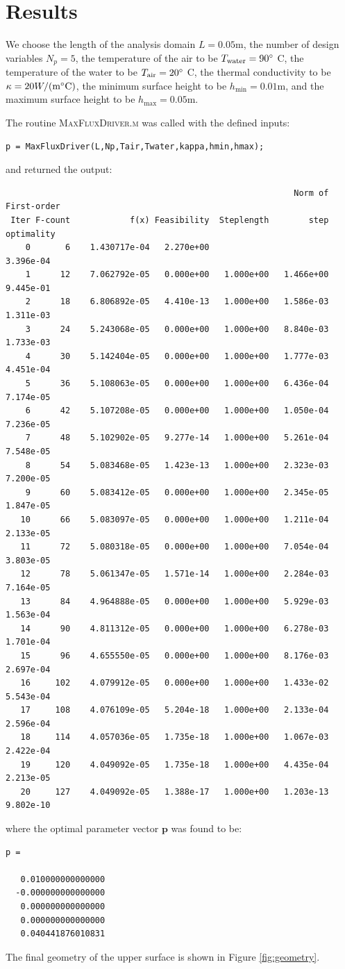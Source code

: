\documentclass[11pt]{article}
\begin{document}
\section{Results}

We choose the length of the analysis domain $L=0.05$m, the
number of design variables $N_p = 5$, the temperature of the
air to be $T_\text{water} = 90 \degree$ C, the temperature of the
water to be $T_\text{air} = 20 \degree$ C, the thermal
conductivity to be $\kappa = 20 W / (\text{m} \degree \text{C})$,
the minimum surface height to be $h_{\text{min}} = 0.01$m, and
the maximum surface height to be $h_{\text{max}} = 0.05$m.

The routine \textsc{MaxFluxDriver.m} was called with the defined
inputs:
\begin{verbatim}
p = MaxFluxDriver(L,Np,Tair,Twater,kappa,hmin,hmax);
\end{verbatim}
and returned the output:
\begin{verbatim}
                                                          Norm of First-order
 Iter F-count            f(x) Feasibility  Steplength        step  optimality
    0       6    1.430717e-04   2.270e+00                           3.396e-04
    1      12    7.062792e-05   0.000e+00   1.000e+00   1.466e+00   9.445e-01
    2      18    6.806892e-05   4.410e-13   1.000e+00   1.586e-03   1.311e-03
    3      24    5.243068e-05   0.000e+00   1.000e+00   8.840e-03   1.733e-03
    4      30    5.142404e-05   0.000e+00   1.000e+00   1.777e-03   4.451e-04
    5      36    5.108063e-05   0.000e+00   1.000e+00   6.436e-04   7.174e-05
    6      42    5.107208e-05   0.000e+00   1.000e+00   1.050e-04   7.236e-05
    7      48    5.102902e-05   9.277e-14   1.000e+00   5.261e-04   7.548e-05
    8      54    5.083468e-05   1.423e-13   1.000e+00   2.323e-03   7.200e-05
    9      60    5.083412e-05   0.000e+00   1.000e+00   2.345e-05   1.847e-05
   10      66    5.083097e-05   0.000e+00   1.000e+00   1.211e-04   2.133e-05
   11      72    5.080318e-05   0.000e+00   1.000e+00   7.054e-04   3.803e-05
   12      78    5.061347e-05   1.571e-14   1.000e+00   2.284e-03   7.164e-05
   13      84    4.964888e-05   0.000e+00   1.000e+00   5.929e-03   1.563e-04
   14      90    4.811312e-05   0.000e+00   1.000e+00   6.278e-03   1.701e-04
   15      96    4.655550e-05   0.000e+00   1.000e+00   8.176e-03   2.697e-04
   16     102    4.079912e-05   0.000e+00   1.000e+00   1.433e-02   5.543e-04
   17     108    4.076109e-05   5.204e-18   1.000e+00   2.133e-04   2.596e-04
   18     114    4.057036e-05   1.735e-18   1.000e+00   1.067e-03   2.422e-04
   19     120    4.049092e-05   1.735e-18   1.000e+00   4.435e-04   2.213e-05
   20     127    4.049092e-05   1.388e-17   1.000e+00   1.203e-13   9.802e-10
\end{verbatim}
where the optimal parameter vector $\boldsymbol{p}$ was found to be:
\begin{verbatim}
p =

   0.010000000000000
  -0.000000000000000
   0.000000000000000
   0.000000000000000
   0.040441876010831
\end{verbatim}
The final geometry of the upper surface is shown in Figure
\ref{fig:geometry}.
\end{document}
